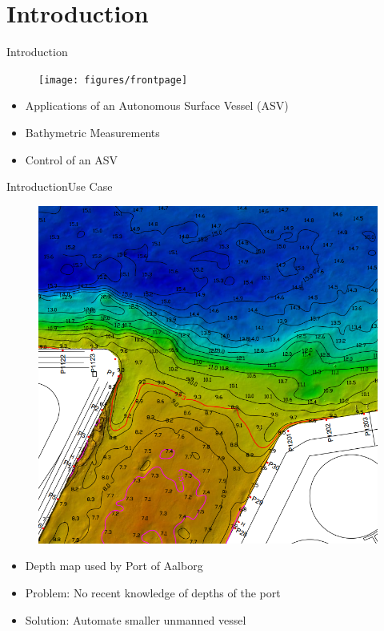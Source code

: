 \section{Introduction}

\begin{frame}{Introduction}{}
    \begin{figure}[H]
        \centering
        \texttt{[image: figures/frontpage]}
    \end{figure}
    \begin{itemize}
         \item Applications of an Autonomous Surface Vessel (ASV)
         \item Bathymetric Measurements
         \item Control of an ASV
    \end{itemize}
\end{frame}

\begin{frame}{Introduction}{Use Case}
    \begin{figure}[H]
        \centering
        \includegraphics[width=.4\linewidth]{figures/smallDebthMapAalborg}
    \end{figure}
    \begin{itemize}
        \item Depth map used by Port of Aalborg 
        \item Problem: No recent knowledge of depths of the port
        \item Solution: Automate smaller unmanned vessel
    \end{itemize}
\end{frame}

